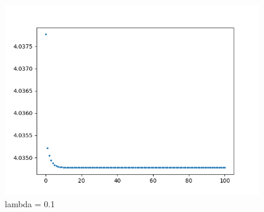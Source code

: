 \documentclass{xjtureport}
\begin{document}
\begin{figure}[H]
    \centering
    \includegraphics[scale = 0.6]{figures/BCD_lam=0.1.png}
    \caption{lambda = 0.1}
    \end{figure}
\end{document}

